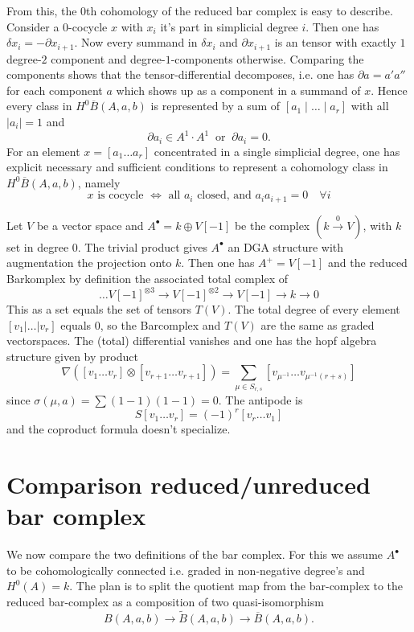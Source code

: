 From this, the $0$th cohomology of the reduced bar complex is easy to describe. 
Consider a 0-cocycle $x$ with $x_i$ it's part in simplicial degree $i$. Then one has $\delta x_i = -\partial x_{i+1}$.
Now every summand in $\delta x_i$ and $\partial x_{i+1}$ is an tensor with exactly $1$ degree-$2$ component and degree-$1$-components otherwise. 
Comparing the components shows that the tensor-differential decomposes, i.e. one has $\partial a = a' a''$ for each component $a$ which shows up as a component in a summand of $x$. 
Hence every class in $H^0 \overline{B}(A, a, b)$ is represented by a sum of $[a_1 \mid \ldots \mid a_r]$ with all $|a_i| = 1$ and 
\[
     \partial a_i \in A^1 \cdot A^1  \ \text{ or } \ \partial a_i = 0.
\]
For an element $x = [a_1 \ldots a_r] $ concentrated in a single simplicial degree, one has explicit necessary and sufficient conditions to represent a cohomology class in $H^0 \overline B(A,a,b)$, namely 
\[ 
  x \text{ is cocycle } \iff \text{ all } a_i \text{ closed, and } a_i a_{i+1} = 0 \quad \forall i 
\]


\begin{exam}
Let $V$ be a vector space and $A^\bullet = k \oplus V[-1]$ be the complex $(k \stackrel{0}{\to} V)$, with $k$ set in degree $0$. 
The trivial product gives $A^\bullet$ an DGA structure with augmentation the projection onto $k$. 
Then one has $A^+ = V[-1]$ and the reduced Barkomplex by definition the associated total complex of
\[ \ldots V[-1]^{\otimes 3} \to V[-1]^{\otimes 2} \to  V[-1] \to  k \to 0\]
This as a set equals the set of tensors $T(V)$. 
The total degree of every element $[v_1 | \ldots | v_r]$ equals $0$, so the Barcomplex and $T(V)$ are the same as graded vectorspaces. 
The (total) differential vanishes and one has the hopf algebra structure given by product 
\[ \nabla ([v_1 \ldots v_r] \otimes [v_{r+1} \ldots v_{r+1}]) = \sum_{\mu \in S_{r,s}} [v_{\mu^{-1}} \ldots v_{\mu^{-1}(r+s)}]
\]
since $\sigma(\mu,a) = \sum (1-1)(1-1) = 0$. The antipode is 
\[ S[v_1 \ldots v_r] = (-1)^r [v_r \ldots v_1] 
\] 
and the coproduct formula doesn't specialize. 
\end{exam}

\section{Comparison reduced/unreduced bar complex}

We now compare the two definitions of the bar complex. 
For this we assume $A^{\bullet}$ to be cohomologically connected i.e. graded in non-negative degree's and $H^0(A) = k$. 
The plan is to split the quotient map from the bar-complex to the reduced bar-complex as a composition of two quasi-isomorphism 
\[
B(A, a, b) \to \widetilde{B}(A, a, b) \to \overline{B}(A, a, b).
\]

